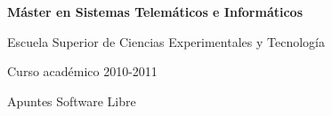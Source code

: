 \thispagestyle{empty}

\vspace{2cm}
\begin{figure}[htb]
\centerline{}
\end{figure}


\begin{center}
{\Large {\bf Máster en Sistemas Telemáticos e Informáticos}}
\vspace{5mm}

{\large Escuela Superior de Ciencias Experimentales y Tecnología}
\vspace{5mm}

{\large Curso académico 2010-2011}

\vspace{2cm}

{\Huge {Apuntes Software Libre }}

\end{center}
